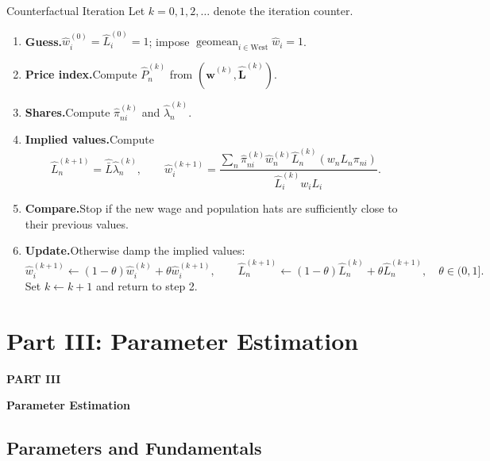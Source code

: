 \documentclass[aspectratio=169,11pt]{beamer}
\newcommand{\B}[1]{\textcolor{blue1}{\textbf{#1}}}
\newcommand{\wh}[1]{\widehat{#1}}
\newcommand{\partdivider}[2]{%
  \begin{frame}[plain]
    \vfill
    \begin{center}
      {\color{deepred}\Large\bfseries PART #1\par}
      \vspace{0.75em}
      {\color{oxfordblue}\LARGE\bfseries #2\par}
    \end{center}
    \vfill
  \end{frame}}
\begin{document}
\begin{frame}[t]{Counterfactual Iteration}
  \small
  \setlength{\abovedisplayskip}{2pt}
  \setlength{\belowdisplayskip}{2pt}
  Let \(k=0,1,2,\ldots\) denote the iteration counter.
  \begin{enumerate}\setlength{\itemsep}{2pt}\setlength{\parskip}{0pt}
    \item \B{Guess.}\quad \(\wh w_i^{(0)}=\wh L_i^{(0)}=1\); impose
      \(\operatorname{geomean}_{i\in\mathrm{West}}\wh w_i=1\).

    \item \B{Price index.}\quad Compute \(\wh P_n^{(k)}\) from
      \((\wh{\mathbf w}^{(k)},\wh{\mathbf L}^{(k)})\).

    \item \B{Shares.}\quad Compute \(\wh\pi_{ni}^{(k)}\) and
      \(\wh\lambda_n^{(k)}\).

    \item \B{Implied values.}\quad Compute
    \[
      \wh L_n^{(k+1)}=\wh{\bar L}\wh\lambda_n^{(k)},
      \qquad
      \wh w_i^{(k+1)}
      =\frac{\sum_n\wh\pi_{ni}^{(k)}\wh w_n^{(k)}\wh L_n^{(k)}
        (w_nL_n\pi_{ni})}
        {\wh L_i^{(k)}w_iL_i}.
    \]

    \item \B{Compare.}\quad Stop if the new wage and population hats are
      sufficiently close to their previous values.

    \item \B{Update.}\quad Otherwise damp the implied values:
    \[
      \wh w_i^{(k+1)}\leftarrow
        (1-\theta)\wh w_i^{(k)}+\theta\wh w_i^{(k+1)},
      \qquad
      \wh L_n^{(k+1)}\leftarrow
        (1-\theta)\wh L_n^{(k)}+\theta\wh L_n^{(k+1)},
      \quad \theta\in(0,1].
    \]
    Set \(k\leftarrow k+1\) and return to step 2.
  \end{enumerate}
\end{frame}

\section{Part III: Parameter Estimation}

\partdivider{III}{Parameter Estimation}

\setcounter{subsection}{0}

\subsection{Parameters and Fundamentals}
\end{document}

